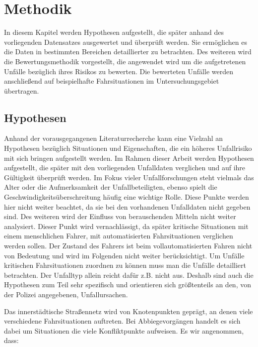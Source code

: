 
\chapter{Methodik}\label{chapter:Methodik}
In diesem Kapitel werden Hypothesen aufgestellt, die später anhand des vorliegenden Datensatzes ausgewertet und überprüft werden. Sie ermöglichen es die Daten in bestimmten Bereichen detaillierter zu betrachten. Des weiteren wird die Bewertungsmethodik vorgestellt, die angewendet wird um die aufgetretenen Unfälle bezüglich ihres Risikos zu bewerten. Die bewerteten Unfälle werden anschließend auf beispielhafte Fahrsituationen im Untersuchungsgebiet übertragen.

\section{Hypothesen}\label{section:Hypothesen}
Anhand der vorausgegangenen Literaturrecherche kann eine Vielzahl an Hypothesen bezüglich Situationen und Eigenschaften, die ein höheres Unfallrisiko mit sich bringen aufgestellt werden. Im Rahmen dieser Arbeit werden Hypothesen aufgestellt, die später mit den vorliegenden Unfalldaten verglichen und auf ihre Gültigkeit überprüft werden. Im Fokus vieler Unfallforschungen steht vielmals das Alter oder die Aufmerksamkeit der Unfallbeteiligten, ebenso spielt die Geschwindigkeitsüberschreitung häufig eine wichtige Rolle. Diese Punkte werden hier nicht weiter beachtet, da sie bei den vorhandenen Unfalldaten nicht gegeben sind. Des weiteren wird der Einfluss von berauschenden Mitteln nicht weiter analysiert. Dieser Punkt wird vernachlässigt, da später kritische Situationen mit einem menschlichen Fahrer, mit automatisierten Fahrsituationen verglichen werden sollen. Der Zustand des Fahrers ist beim vollautomatisierten Fahren nicht von Bedeutung und wird im Folgenden nicht weiter berücksichtigt. Um Unfälle kritischen Fahrsituationen zuordnen zu können muss man die Unfälle detailliert betrachten. Der Unfalltyp allein reicht dafür z.B. nicht aus. Deshalb sind auch die Hypothesen zum Teil sehr spezifisch und orientieren sich größtenteils an den, von der Polizei angegebenen, Unfallursachen.

Das innerstädtische Straßennetz wird von Knotenpunkten geprägt, an denen viele verschiedene Fahrsituationen auftreten. Bei Abbiegevorgängen handelt es sich dabei um Situationen die viele Konfliktpunkte aufweisen. Es wir angenommen, dass:

